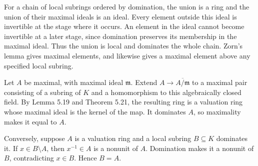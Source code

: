 For a chain of local subrings ordered by domination, the union is a ring and the union of their maximal ideals is an ideal. Every element outside this ideal is invertible at the stage where it occurs. An element in the ideal cannot become invertible at a later stage, since domination preserves its membership in the maximal ideal. Thus the union is local and dominates the whole chain. Zorn's lemma gives maximal elements, and likewise gives a maximal element above any specified local subring.

Let $A$ be maximal, with maximal ideal $\mathfrak{m}$. Extend $A\to\overline{A/\mathfrak{m}}$ to a maximal pair consisting of a subring of $K$ and a homomorphism to this algebraically closed field. By Lemma 5.19 and Theorem 5.21, the resulting ring is a valuation ring whose maximal ideal is the kernel of the map. It dominates $A$, so maximality makes it equal to $A$.

Conversely, suppose $A$ is a valuation ring and a local subring $B\subseteq K$ dominates it. If $x\in B\setminus A$, then $x^{-1}\in A$ is a nonunit of $A$. Domination makes it a nonunit of $B$, contradicting $x\in B$. Hence $B=A$.
